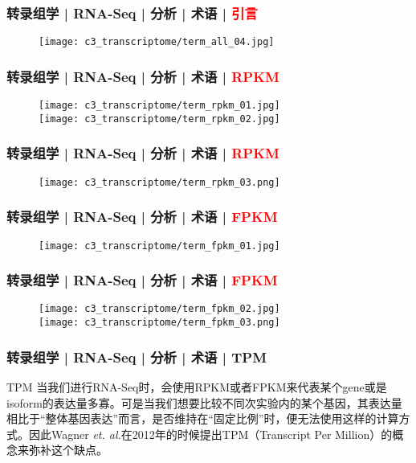 \begin{frame}
  \frametitle{转录组学 | RNA-Seq | 分析 | 术语 | \textcolor{red}{引言}}
  \begin{figure}
    \centering
    \texttt{[image: c3\_transcriptome/term\_all\_04.jpg]}
  \end{figure}
\end{frame}

\begin{frame}
  \frametitle{转录组学 | RNA-Seq | 分析 | 术语 | \textcolor{red}{RPKM}}
  \begin{figure}
    \centering
    \texttt{[image: c3\_transcriptome/term\_rpkm\_01.jpg]}\\
    \vspace{1em}
    \texttt{[image: c3\_transcriptome/term\_rpkm\_02.jpg]}
  \end{figure}
\end{frame}

\begin{frame}
  \frametitle{转录组学 | RNA-Seq | 分析 | 术语 | \textcolor{red}{RPKM}}
  \begin{figure}
    \centering
    \texttt{[image: c3\_transcriptome/term\_rpkm\_03.png]}
  \end{figure}
\end{frame}

\begin{frame}
  \frametitle{转录组学 | RNA-Seq | 分析 | 术语 | \textcolor{red}{FPKM}}
  \begin{figure}
    \centering
    \texttt{[image: c3\_transcriptome/term\_fpkm\_01.jpg]}
  \end{figure}
\end{frame}

\begin{frame}
  \frametitle{转录组学 | RNA-Seq | 分析 | 术语 | \textcolor{red}{FPKM}}
  \begin{figure}
    \centering
    \texttt{[image: c3\_transcriptome/term\_fpkm\_02.jpg]}\\
    \vspace{1em}
    \texttt{[image: c3\_transcriptome/term\_fpkm\_03.png]}
  \end{figure}
\end{frame}

\begin{frame}
  \frametitle{转录组学 | RNA-Seq | 分析 | 术语 | TPM}
  \begin{block}{TPM}
    当我们进行RNA-Seq时，会使用RPKM或者FPKM来代表某个gene或是isoform的表达量多寡。可是当我们想要比较不同次实验内的某个基因，其表达量相比于“整体基因表达”而言，是否维持在“固定比例”时，便无法使用这样的计算方式。因此Wagner \textit{et. al.}在2012年的时候提出TPM（Transcript Per Million）的概念来弥补这个缺点。
  \end{block}
\end{frame}

